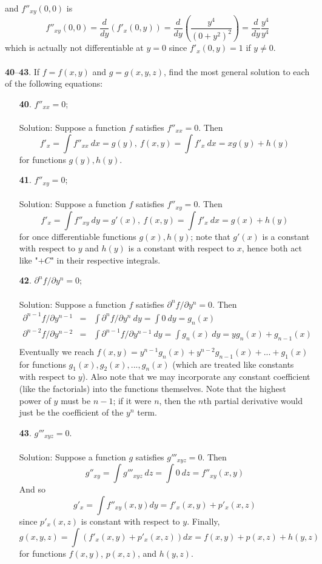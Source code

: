 \documentclass[12pt]{amsbook}
\begin{document}
and $f''_{xy}(0,0)$ is 
$$f''_{xy}(0,0)=\frac{d}{dy}(f'_{x}(0,y))=\frac{d}{dy}(\frac{y^4}{(0+y^2)^2})=\frac{d}{dy}\frac{y^4}{y^4}$$
which is actually not differentiable at $y=0$ since $f'_x(0,y)=1$ if $y\neq 0$.
\\
\\
\noindent
{\small {\bf 40}--{\bf 43}}. If $f = f(x, y)$ and $g = g(x, y, z)$, find the most general solution to
each of the following equations:
\begin{enumerate}
\item[{\small\bf 40}.] $f''_{xx}=0$;
\\
\\
{\sc Solution}: Suppose a function $f$ satisfies $f''_{xx}=0$. Then 
$$f'_x=\int f''_{xx} \ dx=g(y), \ f(x,y)=\int f'_x \ dx=xg(y)+h(y)$$
for functions $g(y),h(y)$. 
\\
\item[{\small\bf 41}.] $f''_{xy}=0$;
\\
\\
{\sc Solution}: Suppose a function $f$ satisfies $f''_{xy}=0$. Then 
$$f'_x=\int f''_{xy} \ dy=g'(x), \ f(x,y)=\int f'_x \ dx= g(x)+h(y)$$
for once differentiable functions $g(x),h(y)$; note that $g'(x)$ is a constant with respect to $y$ and $h(y)$ is a constant with respect to $x$, hence both act like "$+C$" in their respective integrals.
\\
\item[{\small\bf 42}.] $\partial^nf/\partial y^n=0$;
\\
\\
{\sc Solution}: Suppose a function $f$ satisfies $\partial^nf/\partial y^n=0$. Then 
\begin{eqnarray*}
\partial^{n-1}f/\partial y^{n-1}&=&\int \partial^nf/\partial y^n  \ dy = \int 0 \ dy = g_n(x) \\
\partial^{n-2}f/\partial y^{n-2}&=&\int \partial^{n-1}f/\partial y^{n-1}  \ dy = \int g_n(x) \ dy = yg_n(x)+g_{n-1}(x) \\
\end{eqnarray*}
Eventually we reach
$f(x,y)=y^{n-1}g_n(x)+y^{n-2}g_{n-1}(x)+...+g_1(x)$
for functions $g_1(x),g_2(x),...,g_n(x)$ (which are treated like constants with respect to $y$). Also note that we may incorporate any constant coefficient (like the factorials) into the functions themselves. Note that the highest power of $y$ must be $n-1$; if it were $n$, then the $n$th partial derivative would just be the coefficient of the $y^n$ term.
\\
\item[{\small\bf 43}.] $g'''_{xyz}=0$.
\\
\\
{\sc Solution}: Suppose a function $g$ satisfies $g'''_{xyz}=0$. Then
$$g''_{xy}= \int g'''_{xyz} \ dz=\int 0 \ dz=f''_{xy}(x,y)$$
And so
$$g'_x= \int f''_{xy}(x,y) dy = f'_x(x,y)+p'_x(x,z)$$
since $p'_x(x,z)$ is constant with respect to $y$. Finally,
$$g(x,y,z)=\int (f'_x(x,y)+p'_x(x,z))dx =  f(x,y)+p(x,z)+h(y,z)$$
for functions $f(x,y)$, $p(x,z)$, and $h(y,z)$.
\\
\end{enumerate}
\end{document}
